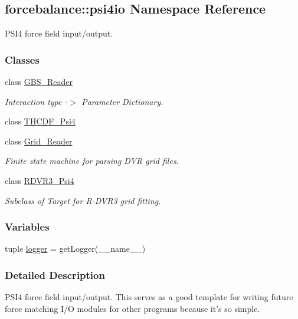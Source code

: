 \hypertarget{namespaceforcebalance_1_1psi4io}{\subsection{forcebalance\-:\-:psi4io \-Namespace \-Reference}
\label{namespaceforcebalance_1_1psi4io}
}


\-P\-S\-I4 force field input/output.  


\subsubsection*{\-Classes}
\begin{DoxyCompactItemize}
\item 
class \hyperlink{classforcebalance_1_1psi4io_1_1GBS__Reader}{\-G\-B\-S\-\_\-\-Reader}
\begin{DoxyCompactList}\small\item\em \-Interaction type -\/$>$ \-Parameter \-Dictionary. \end{DoxyCompactList}\item 
class \hyperlink{classforcebalance_1_1psi4io_1_1THCDF__Psi4}{\-T\-H\-C\-D\-F\-\_\-\-Psi4}
\item 
class \hyperlink{classforcebalance_1_1psi4io_1_1Grid__Reader}{\-Grid\-\_\-\-Reader}
\begin{DoxyCompactList}\small\item\em \-Finite state machine for parsing \-D\-V\-R grid files. \end{DoxyCompactList}\item 
class \hyperlink{classforcebalance_1_1psi4io_1_1RDVR3__Psi4}{\-R\-D\-V\-R3\-\_\-\-Psi4}
\begin{DoxyCompactList}\small\item\em \-Subclass of \-Target for \-R-\/\-D\-V\-R3 grid fitting. \end{DoxyCompactList}\end{DoxyCompactItemize}
\subsubsection*{\-Variables}
\begin{DoxyCompactItemize}
\item 
tuple \hyperlink{namespaceforcebalance_1_1psi4io_a85855b56ce0b3b067933fa20103854c3}{logger} = get\-Logger(\-\_\-\-\_\-name\-\_\-\-\_\-)
\end{DoxyCompactItemize}


\subsubsection{\-Detailed \-Description}
\-P\-S\-I4 force field input/output. \-This serves as a good template for writing future force matching \-I/\-O modules for other programs because it's so simple.

